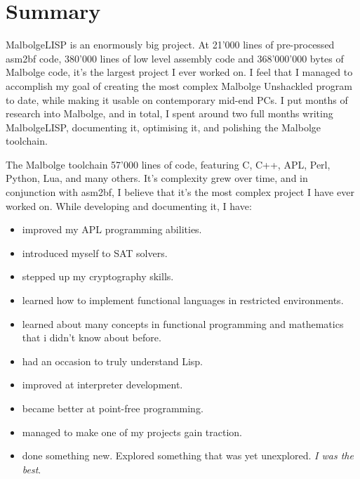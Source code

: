 
\chapter{Summary}

\par MalbolgeLISP is an enormously big project. At 21'000 lines of pre-processed asm2bf code, 380'000 lines of low level assembly code and 368'000'000 bytes of Malbolge code, it's the largest project I ever worked on. I feel that I managed to accomplish my goal of creating the most complex Malbolge Unshackled program to date, while making it usable on contemporary mid-end PCs. I put months of research into Malbolge, and in total, I spent around two full months writing MalbolgeLISP, documenting it, optimising it, and polishing the Malbolge toolchain.

\par The Malbolge toolchain 57'000 lines of code, featuring C, C++, APL, Perl, Python, Lua, and many others. It's complexity grew over time, and in conjunction with asm2bf, I believe that it's the most complex project I have ever worked on. While developing and documenting it, I have:
\begin{itemize}
    \item improved my APL programming abilities.
    \item introduced myself to SAT solvers.
    \item stepped up my cryptography skills.
    \item learned how to implement functional languages in restricted environments.
    \item learned about many concepts in functional programming and mathematics that i didn't know about before.
    \item had an occasion to truly understand Lisp.
    \item improved at interpreter development.
    \item became better at point-free programming.
    \item managed to make one of my projects gain traction.
    \item done something new. Explored something that was yet unexplored. \textit{I was the best}.
\end{itemize}
